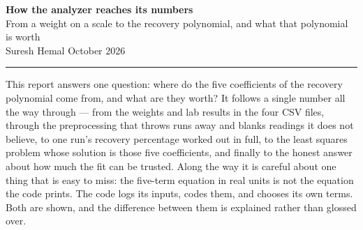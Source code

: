 \documentclass[11pt,a4paper]{article}
\begin{document}
\begin{center}
  {\large\bfseries How the analyzer reaches its numbers}\\[0.35em]
  {\normalsize From a weight on a scale to the recovery polynomial,
   and what that polynomial is worth}\\[0.9em]
  {\small Suresh Hemal \quad\textbullet{} October 2026}
\end{center}
\vspace{0.4em}
\hrule
\vspace{1.2em}

{\parskip=0pt
\tableofcontents
}

\vspace{1.2em}

This report answers one question: where do the five coefficients of the recovery polynomial come
from, and what are they worth? It follows a single number all the way through --- from the
weights and lab results in the four CSV files, through the preprocessing that throws runs away
and blanks readings it does not believe, to one run's recovery percentage worked out in full,
to the least squares problem whose solution is those five coefficients, and finally to the
honest answer about how much the fit can be trusted. Along the way it is careful about one thing
that is easy to miss: the five-term equation in real units is not the equation the code prints.
The code logs its inputs, codes them, and chooses its own terms. Both are shown, and the
difference between them is explained rather than glossed over.

\clearpage


\clearpage

\clearpage

\clearpage

\end{document}
